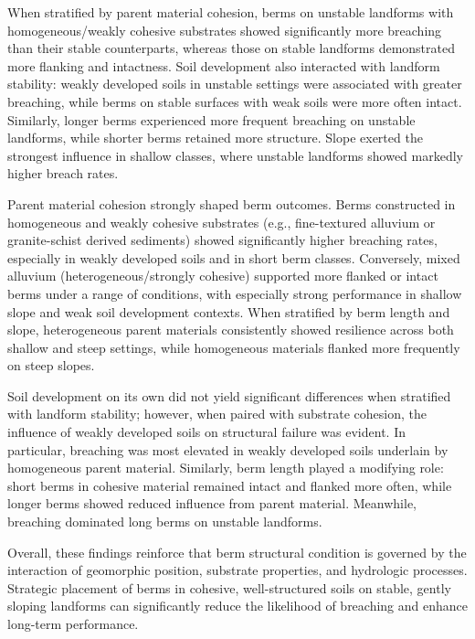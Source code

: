 \documentclass[review]{elsarticle}
\begin{document}
When stratified by parent material cohesion, berms on unstable landforms with homogeneous/weakly cohesive substrates showed significantly more breaching than their stable counterparts, whereas those on stable landforms demonstrated more flanking and intactness. Soil development also interacted with landform stability: weakly developed soils in unstable settings were associated with greater breaching, while berms on stable surfaces with weak soils were more often intact. Similarly, longer berms experienced more frequent breaching on unstable landforms, while shorter berms retained more structure. Slope exerted the strongest influence in shallow classes, where unstable landforms showed markedly higher breach rates.

Parent material cohesion strongly shaped berm outcomes. Berms constructed in homogeneous and weakly cohesive substrates (e.g., fine-textured alluvium or granite-schist derived sediments) showed significantly higher breaching rates, especially in weakly developed soils and in short berm classes. Conversely, mixed alluvium (heterogeneous/strongly cohesive) supported more flanked or intact berms under a range of conditions, with especially strong performance in shallow slope and weak soil development contexts. When stratified by berm length and slope, heterogeneous parent materials consistently showed resilience across both shallow and steep settings, while homogeneous materials flanked more frequently on steep slopes.

Soil development on its own did not yield significant differences when stratified with landform stability; however, when paired with substrate cohesion, the influence of weakly developed soils on structural failure was evident. In particular, breaching was most elevated in weakly developed soils underlain by homogeneous parent material. Similarly, berm length played a modifying role: short berms in cohesive material remained intact and flanked more often, while longer berms showed reduced influence from parent material. Meanwhile, breaching dominated long berms on unstable landforms.

Overall, these findings reinforce that berm structural condition is governed by the interaction of geomorphic position, substrate properties, and hydrologic processes. Strategic placement of berms in cohesive, well-structured soils on stable, gently sloping landforms can significantly reduce the likelihood of breaching and enhance long-term performance.
\end{document}
